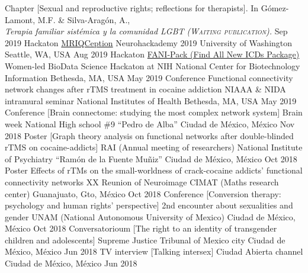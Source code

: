 \begin{cvproceedings}
    \cvproceeding
        {Chapter}
        {[Sexual and reproductive rights; reflections for therapists]. In Gómez-Lamont, M.F. \& Silva-Aragón, A., \\\slshape{\color{awesome}Terapia familiar sistémica y la comunidad LGBT} (\scshape{Waiting publication}).}
        {}
        {}
        {}
        {Sep 2019}
    \cvproceeding
        {Hackaton}
        {\href{https://github.com/elizabethbeard/mriqception}{MRIQCeption}}
        {Neurohackademy 2019}
        {University of Washington}
        {Seattle, WA, USA}
        {Aug 2019}
    \cvproceeding
        {Hackaton}
        {\href{https://github.com/NCBI-Hackathons/Design-of-ICD-9-to-10-conversion-function-for-the-R-package-icd}{FANI-Pack (Find All New ICDs Package)}}
        {Women-led BioData Science Hackaton at NIH}
        {National Center for Biotechnology Information}
        {Bethesda, MA, USA}
        {May 2019}
    \cvproceeding
        {Conference}
        {Functional connectivity network changes after rTMS treatment in cocaine addiction}
        {NIAAA \& NIDA intramural seminar}
        {National Institutes of Health}
        {Bethesda, MA, USA}
        {May 2019}
    \cvproceeding
        {Conference}
        {[Brain connectome: studying the most complex network system]}
        {Brain week}
        {National High school \#9 ``Pedro de Alba''}
        {Ciudad de México, México}
        {Nov 2018}
    \cvproceeding
        {Poster}
        {[Graph theory analysis on functional networks after double-blinded rTMS on cocaine-addicts]}
        {RAI (Annual meeting of researchers)}
        {National Institute of Psychiatry ``Ramón de la Fuente Muñiz''}
        {Ciudad de México, México}
        {Oct 2018}
    \cvproceeding
        {Poster}
        {Effects of rTMs on the small-worldness of crack-cocaine addicts' functional connectivity networks}
        {XX Reunion of Neuroimage}
        {CIMAT (Maths research center)}
        {Guanajuato, Gto, México}
        {Oct 2018}
    \cvproceeding
        {Conference}
        {[Conversion therapy: psychology and human rights' perspective]}
        {2nd encounter about sexualities and gender}
        {UNAM (National Autonomous University of Mexico)}
        {Ciudad de México, México}
        {Oct 2018}
    \cvproceeding
        {Conversatorioum}
        {[The right to an identity of transgender children and adolescents]}
        {}
        {Supreme Justice Tribunal of Mexico city}
        {Ciudad de México, México}
        {Jun 2018}
    \cvproceeding
        {TV interview}
        {[Talking intersex]}
        {}
        {Ciudad Abierta channel}
        {Ciudad de México, México}
        {Jun 2018}
\end{cvproceedings}
